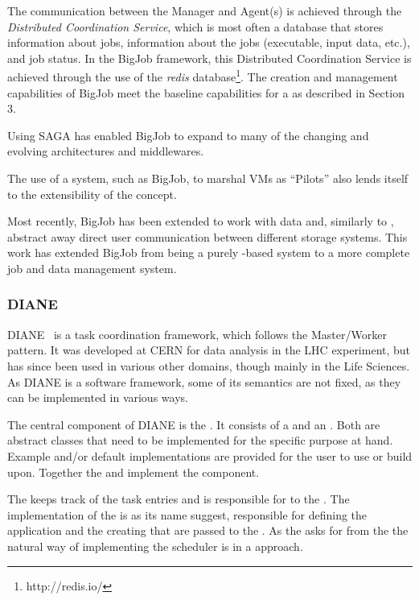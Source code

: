 \documentclass{sig-alternate}
\begin{document}
The communication between the Manager and Agent(s) is achieved through
the {\it Distributed Coordination Service}, which is most often a
database that stores information about jobs, information about the
jobs (executable, input data, etc.), and job status. In the BigJob framework,
this Distributed Coordination Service is achieved through the use
of the \textit{redis} database\footnote{http://redis.io/}.
The \pilot creation and management capabilities of BigJob meet
the baseline capabilities for a \pilotjob as described in Section 3.

Using SAGA has enabled BigJob to expand to many of the changing and evolving
architectures and middlewares.

The use of a \pilotjob system, such as BigJob, to marshal VMs as ``Pilots''
also lends itself to the extensibility of the \pilotjob concept.

Most recently, BigJob has been extended to work with data and, similarly to
\pilotjobs, abstract away direct user communication between different storage
systems.
This work has extended BigJob from being a purely \pilotjob-based system to a
more complete job and data management system.

%
%
\subsubsection{DIANE}

DIANE~\cite{Moscicki:908910} is a task coordination framework, which follows
the Master/Worker pattern.
It was developed at CERN for data analysis in the LHC experiment, but has since
been used in various other domains, though mainly in the Life Sciences.
As DIANE is a software framework, some of its semantics are not fixed, as they
can be implemented in various ways.

The central component of DIANE is the .
It consists of a  and an .
Both are abstract classes that need to be implemented for the specific purpose
at hand. Example and/or default implementations are provided for the user to
use or build upon.
Together the  and  implement
the  component.

The  keeps track of the task entries and is responsible
for  to the .
The implementation of the  is as its name suggest,
responsible for defining the application  and the creating
 that are passed to the .
As the  asks for  from the
 the natural way of implementing the scheduler is in a
 approach.
\end{document}
